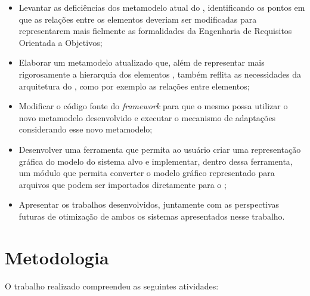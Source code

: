 \begin{itemize}
	
	\item Levantar as deficiências dos metamodelo atual do \zanshin, identificando os pontos em que as relações entre os elementos deveriam ser modificadas para representarem mais fielmente as formalidades da Engenharia de Requisitos Orientada a Objetivos;
	
	\item Elaborar um metamodelo atualizado que, além de representar mais rigorosamente a hierarquia dos elementos \gore, também reflita as necessidades da arquitetura do \zanshin, como por exemplo as relações entre elementos;
	
	\item Modificar o código fonte do \textit{framework} para que o mesmo possa utilizar o novo metamodelo desenvolvido e executar o mecanismo de adaptações considerando esse novo metamodelo;
	
	\item Desenvolver uma ferramenta que permita ao usuário criar uma representação gráfica do modelo do sistema alvo e implementar, dentro dessa ferramenta, um módulo que permita converter o modelo gráfico representado para arquivos \xml que podem ser importados diretamente para o \zanshin;
	
	\item Apresentar os trabalhos desenvolvidos, juntamente com as perspectivas futuras de otimização de ambos os sistemas apresentados nesse trabalho.

\end{itemize}


\section{Metodologia}
\label{sec-intro-metodologia}

O trabalho realizado compreendeu as seguintes atividades:


